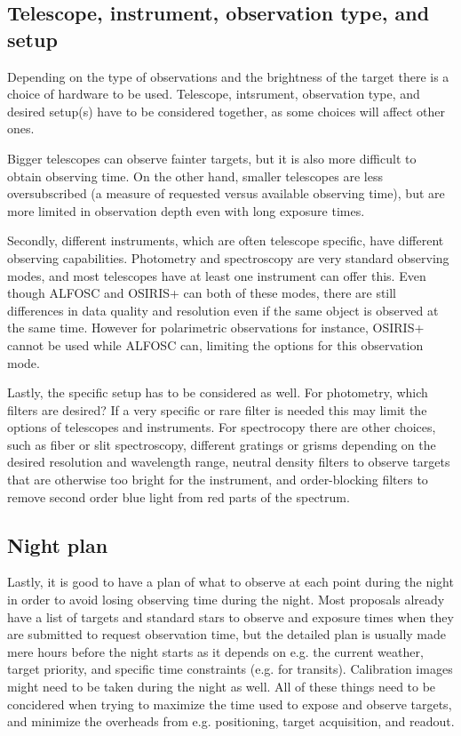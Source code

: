 \documentclass[a4paper,oneside,12pt, class=Latex/Classes/PhDthesisPSnPDF, crop=false]{standalone}
\begin{document}
\subsection{Telescope, instrument, observation type, and setup}
Depending on the type of observations and the brightness of the target there is a choice of hardware to be used. Telescope, intsrument, observation type, and desired setup(s) have to be considered together, as some choices will affect other ones.

Bigger telescopes can observe fainter targets, but it is also more difficult to obtain observing time. On the other hand, smaller telescopes are less oversubscribed (a measure of requested versus available observing time), but are more limited in observation depth even with long exposure times. %

Secondly, different instruments, which are often telescope specific, have different observing capabilities. Photometry and spectroscopy are very standard observing modes, and most telescopes have at least one instrument can offer this. Even though ALFOSC and OSIRIS+ can both of these modes, there are still differences in data quality and resolution even if the same object is observed at the same time. However for polarimetric observations for instance, OSIRIS+ cannot be used while ALFOSC can, limiting the options for this observation mode.

Lastly, the specific setup has to be considered as well. For photometry, which filters are desired? If a very specific or rare filter is needed this may limit the options of telescopes and instruments. For spectrocopy there are other choices, such as fiber or slit spectroscopy, different gratings or grisms depending on the desired resolution and wavelength range, neutral density filters to observe targets that are otherwise too bright for the instrument, and order-blocking filters to remove second order blue light from red parts of the spectrum.


\subsection{Night plan}
Lastly, it is good to have a plan of what to observe at each point during the night in order to avoid losing observing time during the night. Most proposals already have a list of targets and standard stars to observe and exposure times when they are submitted to request observation time, but the detailed plan is usually made mere hours before the night starts as it depends on e.g. the current weather, target priority, and specific time constraints (e.g. for transits). Calibration images might need to be taken during the night as well. All of these things need to be concidered when trying to maximize the time used to expose and observe targets, and minimize the overheads from e.g. positioning, target acquisition, and readout.
\end{document}
